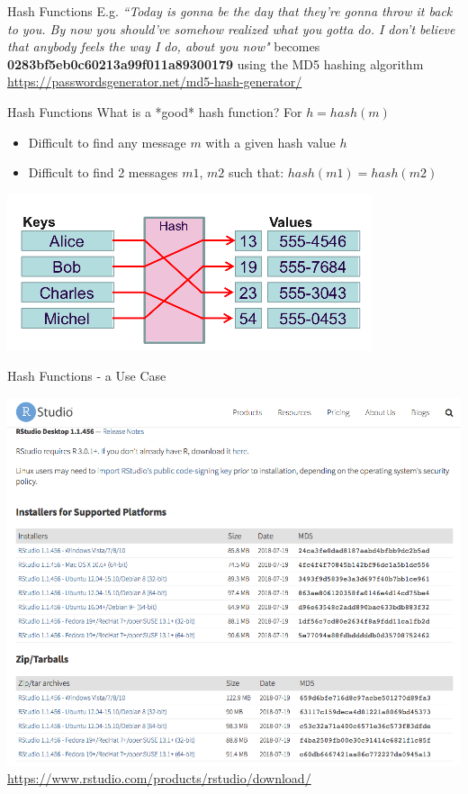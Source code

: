 \documentclass[aspectratio=169]{beamer}
\begin{document}
\begin{frame}{Hash Functions}
E.g. \textit{``Today is gonna be the day that they're gonna throw it back to you. By now you should've somehow realized what you gotta do. I don't believe that anybody feels the way I do, about you now"} 
becomes \textbf{0283bf5eb0c60213a99f011a89300179} using the MD5 hashing algorithm
\newline
\url{https://passwordsgenerator.net/md5-hash-generator/}
\end{frame}

\begin{frame}{Hash Functions}
What is a *good* hash function? For \(h = hash(m)\)
\begin{itemize}
\item Difficult to find any message \(m\) with a given hash value \(h\)
\item Difficult to find 2 messages \(m1\), \(m2\) such that: \(hash(m1) = hash(m2)\)
\end{itemize}
\begin{center}
	\includegraphics[width=0.5\linewidth]{hash.png}
\end{center}
\end{frame}

\begin{frame}{{\color{red}Hash Functions - a Use Case}}
\begin{center}
	\includegraphics[width=0.65\linewidth]{r-studio.png}
    \newline
	{\footnotesize \url{https://www.rstudio.com/products/rstudio/download/} }
\end{center}
\end{frame}
\end{document}
